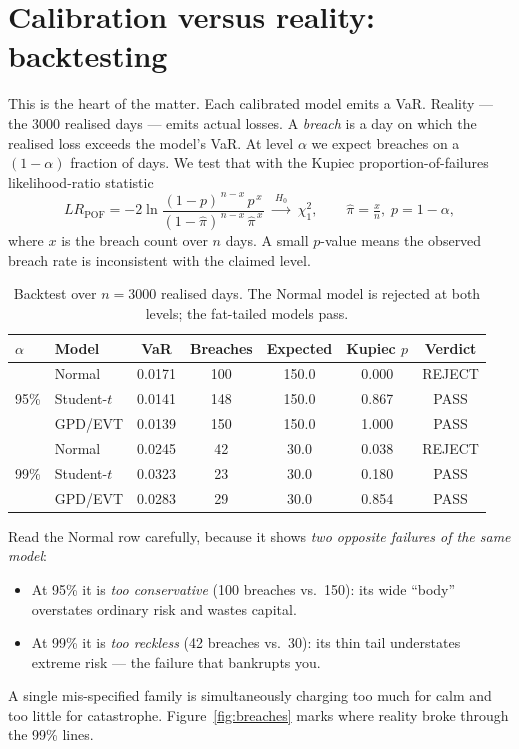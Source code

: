 \documentclass[11pt]{article}
\begin{document}
\section{Calibration versus reality: backtesting}
This is the heart of the matter. Each calibrated model emits a VaR. Reality ---
the \num{3000} realised days --- emits actual losses. A \emph{breach} is a day
on which the realised loss exceeds the model's VaR. At level $\alpha$ we expect
breaches on a $(1-\alpha)$ fraction of days. We test that with the Kupiec
proportion-of-failures likelihood-ratio statistic
\[
  LR_{\text{POF}} = -2\ln\!\frac{(1-p)^{\,n-x}\,p^{\,x}}
        {(1-\hat\pi)^{\,n-x}\,\hat\pi^{\,x}}
  \;\xrightarrow{\;H_0\;}\;\chi^2_1,
  \qquad \hat\pi=\tfrac{x}{n},\; p=1-\alpha,
\]
where $x$ is the breach count over $n$ days. A small $p$-value means the
observed breach rate is inconsistent with the claimed level.

\begin{table}[h]
  \centering
  \caption{Backtest over $n=\num{3000}$ realised days. The Normal model is
  \textcolor{brick}{rejected} at both levels; the fat-tailed models pass.}
  \label{tab:backtest}
  \begin{tabular}{llccccc}
    \toprule
    $\alpha$ & Model & VaR & Breaches & Expected & Kupiec $p$ & Verdict\\
    \midrule
    \multirow{3}{*}{95\%}
      & Normal      & 0.0171 & 100 & 150.0 & 0.000 & \textcolor{brick}{REJECT}\\
      & Student-$t$ & 0.0141 & 148 & 150.0 & 0.867 & PASS\\
      & GPD/EVT     & 0.0139 & 150 & 150.0 & 1.000 & PASS\\
    \midrule
    \multirow{3}{*}{99\%}
      & Normal      & 0.0245 &  42 &  30.0 & 0.038 & \textcolor{brick}{REJECT}\\
      & Student-$t$ & 0.0323 &  23 &  30.0 & 0.180 & PASS\\
      & GPD/EVT     & 0.0283 &  29 &  30.0 & 0.854 & PASS\\
    \bottomrule
  \end{tabular}
\end{table}

\noindent Read the Normal row carefully, because it shows \emph{two opposite
failures of the same model}:
\begin{itemize}[nosep]
  \item At 95\% it is \emph{too conservative} (100 breaches vs.\ 150): its wide
        ``body'' overstates ordinary risk and wastes capital.
  \item At 99\% it is \emph{too reckless} (42 breaches vs.\ 30): its thin tail
        understates extreme risk --- the failure that bankrupts you.
\end{itemize}
A single mis-specified family is simultaneously charging too much for calm and
too little for catastrophe. Figure~\ref{fig:breaches} marks where reality broke
through the 99\% lines.
\end{document}
